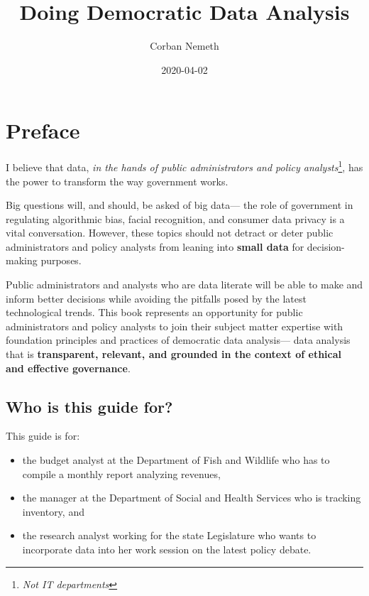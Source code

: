 \documentclass[]{book}
\title{Doing Democratic Data Analysis}
\author{Corban Nemeth}
\date{2020-04-02}
\providecommand{\tightlist}{%
  \setlength{\itemsep}{0pt}\setlength{\parskip}{0pt}}
\begin{document}
\maketitle

{
\setcounter{tocdepth}{1}
\tableofcontents
}
\chapter*{Preface}\label{preface}

I believe that data, \emph{in the hands of public administrators and
policy analysts}\footnote{\emph{Not IT departments}}, has the power to
transform the way government works.

Big questions will, and should, be asked of big data--- the role of
government in regulating algorithmic bias, facial recognition, and
consumer data privacy is a vital conversation. However, these topics
should not detract or deter public administrators and policy analysts
from leaning into \textbf{small data} for decision-making purposes.

Public administrators and analysts who are data literate will be able to
make and inform better decisions while avoiding the pitfalls posed by
the latest technological trends. This book represents an opportunity for
public administrators and policy analysts to join their subject matter
expertise with foundation principles and practices of democratic data
analysis--- data analysis that is \textbf{transparent, relevant, and
grounded in the context of ethical and effective governance}.

\section*{Who is this guide for?}\label{who-is-this-guide-for}

This guide is for:

\begin{itemize}
\tightlist
\item
  the budget analyst at the Department of Fish and Wildlife who has to
  compile a monthly report analyzing revenues,
\item
  the manager at the Department of Social and Health Services who is
  tracking inventory, and
\item
  the research analyst working for the state Legislature who wants to
  incorporate data into her work session on the latest policy debate.
\end{itemize}
\end{document}
